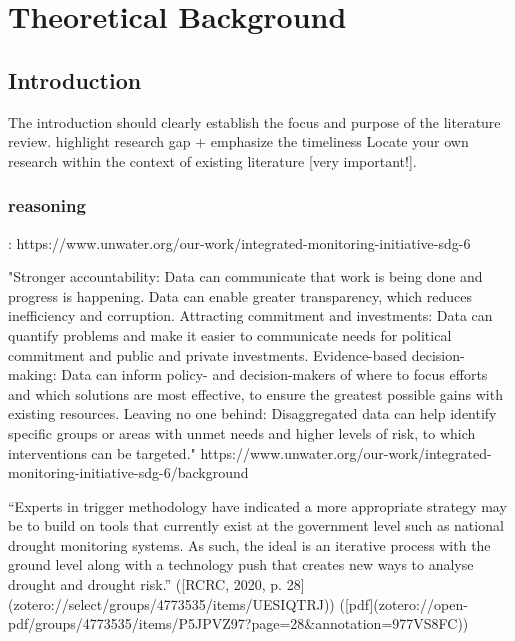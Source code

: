 
\chapter{Theoretical Background} %

\label{Chapter2} %


\section{Introduction}
The introduction should clearly establish the focus and purpose of the literature review.
highlight research gap + emphasize the timeliness
Locate your own research within the context of existing literature [very important!]. 


\subsection{reasoning}:
https://www.unwater.org/our-work/integrated-monitoring-initiative-sdg-6

"Stronger accountability: Data can communicate that work is being done and progress is happening. Data can enable greater transparency, which reduces inefficiency and corruption.
Attracting commitment and investments: Data can quantify problems and make it easier to communicate needs for political commitment and public and private investments.
Evidence-based decision-making: Data can inform policy- and decision-makers of where to focus efforts and which solutions are most effective, to ensure the greatest possible gains with existing resources.
Leaving no one behind: Disaggregated data can help identify specific groups or areas with unmet needs and higher levels of risk, to which interventions can be targeted."
https://www.unwater.org/our-work/integrated-monitoring-initiative-sdg-6/background

“Experts in trigger methodology have indicated a more appropriate strategy may be to build on tools that currently exist at the government level such as national drought monitoring systems. As such, the ideal is an iterative process with the ground level along with a technology push that creates new ways to analyse drought and drought risk.” ([RCRC, 2020, p. 28](zotero://select/groups/4773535/items/UESIQTRJ)) ([pdf](zotero://open-pdf/groups/4773535/items/P5JPVZ97?page=28&annotation=977VS8FC))

